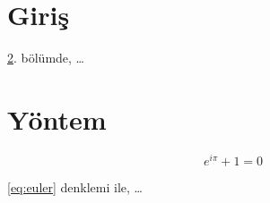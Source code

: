 \documentclass{article}
\begin{document}
\section{Giriş}
\label{sec:intro}

\ref{sec:method}. bölümde, \ldots

\section{Yöntem}
\label{sec:method}

\begin{equation}
\label{eq:euler}
e^{i\pi} + 1 = 0
\end{equation}

\eqref{eq:euler} denklemi ile, \ldots
\end{document}
